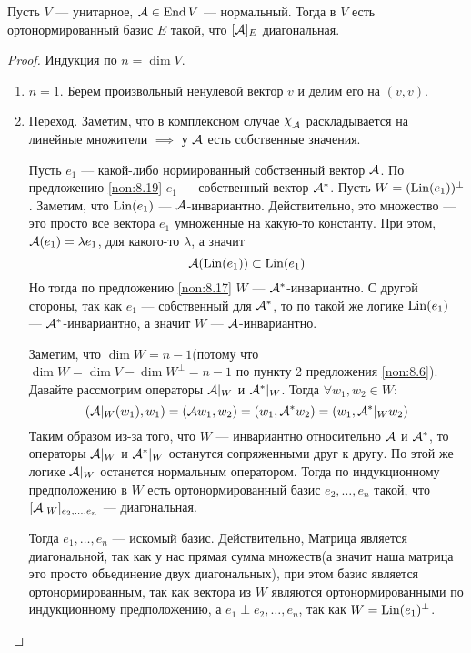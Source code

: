 \documentclass[../main.tex]{subfiles}
\begin{document}
\begin{theorem}
\label{th:8.5}
  Пусть $V$ --- унитарное, $\mathcal{A} \in \operatorname{End} V$ --- нормальный. Тогда в $V$ есть ортонормированный базис $E$ такой, что $[\mathcal{A}]_E$ диагональная.
\end{theorem}
\begin{proof}
  Индукция по $n = \dim V$.
  \begin{enumerate}
    \item $n = 1$. Берем произвольный ненулевой вектор $v$ и делим его на $(v, v)$.
    \item Переход. Заметим, что в комплексном случае $\rchi_{\A}$ раскладывается на линейные множители $\implies$ у $\mathcal{A}$ есть собственные значения.

    Пусть $e_1$ --- какой-либо нормированный собственный вектор $\mathcal{A}$. По предложению \ref{non:8.19} $e_1$ --- собственный вектор $\mathcal{A}^{*}$. Пусть $W = (\operatorname{Lin} (e_1))^\perp$. Заметим, что $\operatorname{Lin}(e_1)$ --- $\mathcal{A}$-инвариантно. Действительно, это множество --- это просто все вектора $e_1$ умноженные на какую-то константу. При этом, $\mathcal{A}(e_1) = \lambda e_1$, для какого-то $\lambda$, а значит
    \begin{equation*}
      \mathcal{A}(\operatorname{Lin}(e_1)) \subset \operatorname{Lin}(e_1)
    \end{equation*}
    Но тогда по предложению \ref{non:8.17} $W$ --- $\mathcal{A}^{*}$-инвариантно. С другой стороны, так как $e_1$ --- собственный для $\mathcal{A}^{*}$, то по такой же логике $\operatorname{Lin}(e_1)$ --- $\mathcal{A}^{*}$-инвариантно, а значит $W$ --- $\mathcal{A}$-инвариантно.

    Заметим, что $\dim W = n - 1$(потому что $\dim W = \dim V - \dim W^\perp = n - 1$ по пункту 2 предложения \ref{non:8.6}). Давайте рассмотрим операторы $\mathcal{A} |_W$ и $\mathcal{A}^{*} |_W$. Тогда $\forall w_1, w_2 \in W$:
    \begin{equation*}
      (\mathcal{A} |_W(w_1), w_1) =
      (\mathcal{A} w_1, w_2) =
      (w_1, \mathcal{A}^{*} w_2) =
      (w_1, \mathcal{A}^{*} |_W w_2)
    \end{equation*}
    Таким образом из-за того, что $W$ --- инвариантно относительно $\mathcal{A}$ и $\mathcal{A}^{*}$, то операторы $\mathcal{A} |_W$ и $\mathcal{A}^{*} |_W$ останутся сопряженными друг к другу. По этой же логике $\mathcal{A} |_W$ останется нормальным оператором. Тогда по индукционному предположению в $W$ есть ортонормированный базис $e_2, \dotsc, e_n$ такой, что $[\mathcal{A} |_W]_{e_2, \dotsc, e_n}$ --- диагональная.

    Тогда $e_1, \dotsc, e_n$ --- искомый базис. Действительно, Матрица является диагональной, так как у нас прямая сумма множеств(а значит наша матрица это просто объединение двух диагональных), при этом базис является ортонормированным, так как вектора из $W$ являются ортонормированными по индукционному предположению, а $e_1 \perp e_2, \dotsc, e_n$, так как $W = \operatorname{Lin}(e_1)^\perp$.
  \end{enumerate}
\end{proof}
\end{document}
